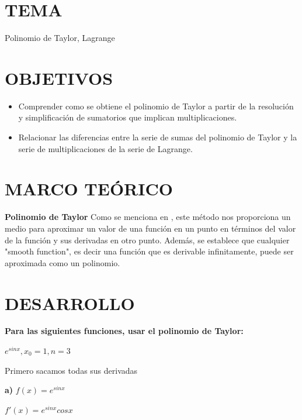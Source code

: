 \documentclass[12pt]{article}
\begin{document}
\section{TEMA}
Polinomio de Taylor, Lagrange

\vspace{0.5cm}

\section{OBJETIVOS}
\begin{itemize}
    \item Comprender como se obtiene el polinomio de Taylor a partir de la resolución y simplificación de sumatorios que implican multiplicaciones.
    \item Relacionar las diferencias entre la serie de sumas del polinomio de Taylor y la serie de multiplicaciones de la serie de Lagrange.

\end{itemize}

\vspace{0.5cm}

\section{MARCO TEÓRICO}

\textbf{Polinomio de Taylor}
\normalsize\newline\newline
Como se menciona en \cite{book:2450406}, este método nos proporciona un medio para aproximar 
un valor de una función en un punto en términos del  valor de la función y sus derivadas en otro punto.
Además, se establece que cualquier "smooth function", es decir una función que es derivable infinitamente, puede ser aproximada como un polinomio. 
\vspace{0.5cm}

\section{DESARROLLO}

\textbf{Para las siguientes funciones, usar el polinomio de Taylor:} 

$e^{sin x}, x_0 = 1, n = 3$

Primero sacamos todas sus derivadas

\textbf{a)} $f(x) = e^{sin x}$

$f'(x) = e^{sin x}cosx$
\end{document}
